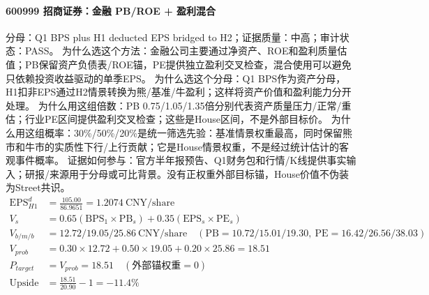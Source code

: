 \paragraph{600999 招商证券：金融 PB/ROE + 盈利混合}
分母：Q1 BPS plus H1 deducted EPS bridged to H2；证据质量：中高；审计状态：PASS。
为什么选这个方法：金融公司主要通过净资产、ROE和盈利质量估值；PB保留资产负债表/ROE锚，PE提供独立盈利交叉检查，混合使用可以避免只依赖投资收益驱动的单季EPS。
为什么选这个分母：Q1 BPS作为资产分母，H1扣非EPS通过H2情景转换为熊/基准/牛盈利；这样将资产价值和盈利能力分开处理。
为什么用这组倍数：PB 0.75/1.05/1.35倍分别代表资产质量压力/正常/重估；行业PE区间提供盈利交叉检查；这些是House区间，不是外部目标价。
为什么用这组概率：30\%/50\%/20\%是统一筛选先验：基准情景权重最高，同时保留熊市和牛市的实质性下行/上行贡献；它是House情景权重，不是经过统计估计的客观事件概率。
证据如何参与：官方半年报预告、Q1财务包和行情/K线提供事实输入；研报/来源用于分母或可比背景。没有正权重外部目标锚，House价值不伪装为Street共识。
\begin{align*}
\mathrm{EPS}_{H1}^d &= \frac{105.00}{86.9651} = 1.2074\ \mathrm{CNY/share}\\
V_s &= 0.65\left(\mathrm{BPS}_1\times \mathrm{PB}_s\right)+0.35\left(\mathrm{EPS}_s\times \mathrm{PE}_s\right)\\
V_{b/m/b} &= 12.72/19.05/25.86\ \mathrm{CNY/share}\quad(\mathrm{PB}=10.72/15.01/19.30,\ \mathrm{PE}=16.42/26.56/38.03)\\
V_{prob} &= 0.30\times 12.72+0.50\times 19.05+0.20\times 25.86=18.51\\
P_{target} &= V_{prob}=18.51\quad(\text{外部锚权重}=0)\\
\mathrm{Upside} &= \frac{18.51}{20.90}-1=-11.4\%\\
\end{align*}

